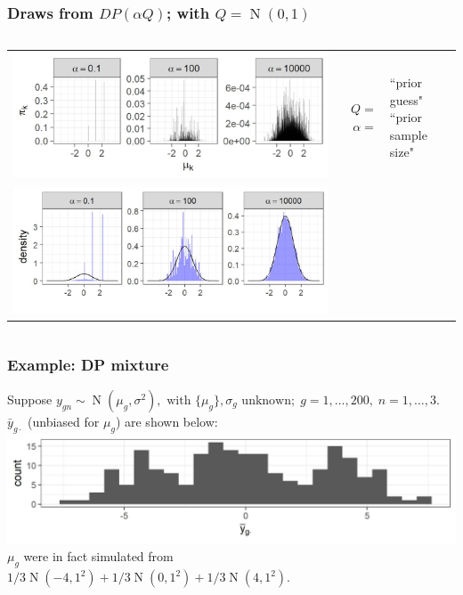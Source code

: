 \documentclass[handout]{beamer}
\newcommand{\op}{\operatorname}
\begin{document}
\begin{frame}%
  \frametitle{Draws from $DP(\alpha Q)$; with $Q=\op{N}(0,1)$}
  \begin{columns}
    \column{\dimexpr\paperwidth-10pt}
    \begin{table}
      \centering
      \scriptsize
      \begin{tabular}{crl}
        \includegraphics[height=.25\textwidth]{dp1}& \multirowcell{2}{ $Q=$\\$\alpha =$} & \multirowcell{2}{ ``prior guess" \\ ``prior sample size"}\\
        \pause\includegraphics[height=.25\textwidth]{dp2}&&\\
      \end{tabular}
    \end{table}
  \end{columns}
\end{frame}

\begin{frame}%
  \frametitle{Example: DP mixture}
  {
    \small Suppose $ y_{gn} \sim \op{N}(\mu_g,\sigma^2),\mbox{ with }\{\mu_g\},\sigma_g\mbox{ unknown}; \; g=1,\ldots,200,\; n=1,\ldots,3$.\\
    \pause $\bar{y}_{g\cdot}$ (unbiased for $\mu_g$) are shown below:\\
    {
      \centering
      \includegraphics[width=.9\textwidth]{samplemeans_ie}
    }\\

    \pause $\mu_g$ were in fact simulated from $1/3\op{N}(-4,1^2) + 1/3\op{N}(0,1^2) + 1/3\op{N}(4,1^2)$.
  }
\end{frame}
\end{document}
